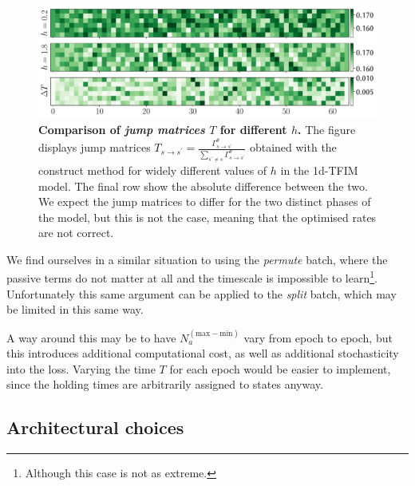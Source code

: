 \begin{figure}[H]
	\centering
	\includegraphics[width=\linewidth]{Chapter5/Figs/Vector/rate_compare2}
	\caption[Comparison of \emph{jump matrices} $T$ for different batch types]{\textbf{Comparison of \emph{jump matrices} $T$ for different $h$.} The figure displays jump matrices $T_{s \rightarrow s^{\prime}}=\frac{\Gamma_{s \rightarrow s^{\prime}}^{\theta}}{\sum_{s^{\prime} \neq s} \Gamma_{s \rightarrow s^{\prime}}^{\theta}}$ obtained with the construct method for widely different values of $h$ in the 1d-TFIM model. The final row show the absolute difference between the two. We expect the jump matrices to differ for the two distinct phases of the model, but this is not the case, meaning that the optimised rates are not correct.}
	\label{fig:ratecompare2}
\end{figure}
We find ourselves in a similar situation to using the \emph{permute} batch, where the passive terms do not matter at all and the timescale is impossible to learn\footnote{Although this case is not as extreme.}. Unfortunately this same argument can be applied to the \emph{split} batch, which may be limited in this same way.

A way around this may be to have $N_a^{(\text{max}-\text{min})}$ vary from epoch to epoch, but this introduces additional computational cost, as well as additional stochasticity into the loss. Varying the time $T$ for each epoch would be easier to implement, since the holding times are arbitrarily assigned to states anyway. 

\newpage
\subsection{Architectural choices}
